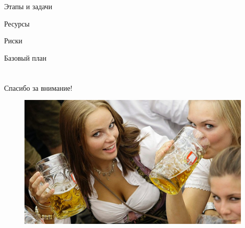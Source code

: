 \documentclass[10pt,pdf,hyperref=unicode,hyperref={bookmarks=false}]{beamer}
\begin{document}
\begin{frame}[allowframebreaks]{Этапы и задачи}
\begin{center}
      \end{center}
    \end{frame}
    \begin{frame}{Ресурсы}
    \end{frame}
    \begin{frame}{Риски}
    \end{frame}
    \begin{frame}{Базовый план}
    \end{frame}
  \section*{}
  \begin{frame}{Спасибо за внимание!}
    \begin{figure}
      \includegraphics[width=\textwidth]{beers1.jpg}
    \end{figure}
  \end{frame}
\end{document}
